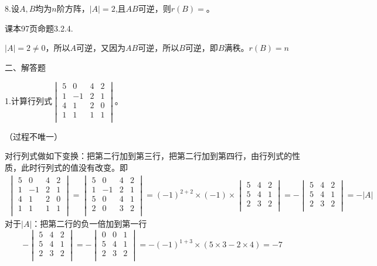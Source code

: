 \documentclass{article}
\begin{document}
8.设$A,B$均为$n$阶方阵，$|A|=2$,且$AB$可逆，则$r(B)=$\underline{\hphantom{~~~~~~~~~~}}。

\begin{jie}
课本97页命题3.2.4.

$|A|=2\neq0$，所以$A$可逆，又因为$AB$可逆，所以$B$可逆，即$B$满秩。$r(B)=n$
\end{jie}

二、解答题

1.计算行列式$
\begin{vmatrix}
  5 & 0 & 4 & 2\\
  1 & -1 & 2 & 1\\
  4 & 1 & 2 & 0\\
  1 & 1 & 1 & 1\\
\end{vmatrix}
$。

\begin{jie}
（过程不唯一）

对行列式做如下变换：把第二行加到第三行，把第二行加到第四行，由行列式的性质，此时行列式的值没有改变。即
\begin{align*}
\begin{vmatrix}
  5 & 0 & 4 & 2\\
  1 & -1 & 2 & 1\\
  4 & 1 & 2 & 0\\
  1 & 1 & 1 & 1\\
\end{vmatrix}=
\begin{vmatrix}
  5 & 0 & 4 & 2\\
  1 & -1 & 2 & 1\\
  5 & 0 & 4 & 1\\
  2 & 0 & 3 & 2\\
\end{vmatrix}
=(-1)^{2+2}\times (-1)\times
\begin{vmatrix}
  5 &  4 & 2\\
  5 &  4 & 1\\
  2 &  3 & 2\\
\end{vmatrix}=-\begin{vmatrix}
  5 &  4 & 2\\
  5 &  4 & 1\\
  2 &  3 & 2\\
\end{vmatrix}=-|A|
\end{align*}
对于$|A|$：把第二行的负一倍加到第一行
\begin{equation*}
-\begin{vmatrix}
  5 &  4 & 2\\
  5 &  4 & 1\\
  2 &  3 & 2\\
\end{vmatrix}=-
\begin{vmatrix}
  0 &  0 & 1\\
  5 &  4 & 1\\
  2 &  3 & 2\\
\end{vmatrix}=-(-1)^{1+3}\times(5\times 3-2\times 4)=-7
\end{equation*}
\end{jie}
\end{document}
